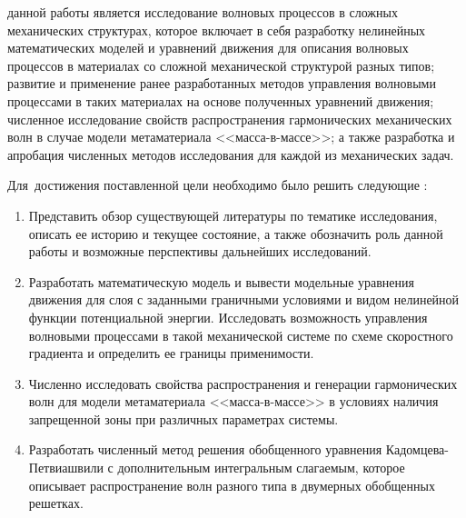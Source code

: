 
{\aim} данной работы является исследование волновых процессов в сложных механических структурах, которое включает в себя разработку нелинейных математических моделей и уравнений движения для описания волновых процессов в материалах со сложной механической структурой разных типов; развитие и применение ранее разработанных методов управления волновыми процессами в таких материалах на основе полученных уравнений движения; численное исследование свойств распространения гармонических механических волн в случае модели метаматериала <<масса-в-массе>>; а также разработка и апробация численных методов исследования для каждой из механических задач.

Для~достижения поставленной цели необходимо было решить следующие {\tasks}:
\begin{enumerate}[beginpenalty=10000] %
  \item {Представить обзор существующей литературы по тематике исследования, описать ее историю и текущее состояние, а также обозначить роль данной работы и возможные перспективы дальнейших исследований.}
  \item {Разработать математическую модель и вывести модельные уравнения движения для слоя с заданными граничными условиями и видом нелинейной функции потенциальной энергии. Исследовать возможность управления волновыми процессами в такой механической системе по схеме скоростного градиента и определить ее границы применимости.}  
  \item {Численно исследовать свойства распространения и генерации гармонических волн для модели метаматериала <<масса-в-массе>> в условиях наличия запрещенной зоны при различных параметрах системы.}  
  \item {Разработать численный метод решения обобщенного уравнения Кадомцева-Петвиашвили с дополнительным интегральным слагаемым, которое описывает распространение волн разного типа в двумерных обобщенных решетках.}
\end{enumerate}


